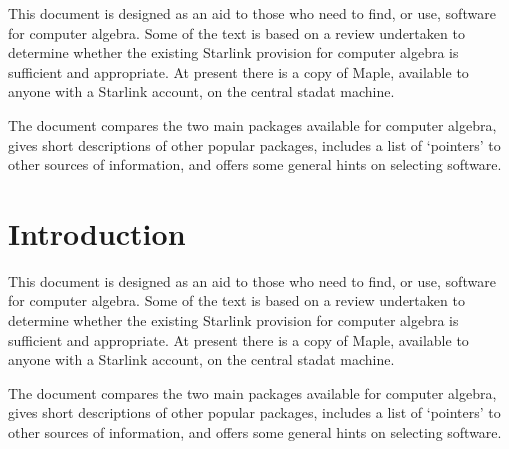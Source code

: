 This document is designed as an aid to those who need to find, or use,
software for computer algebra.
Some of the text is based on a review undertaken to determine whether
the existing Starlink provision for computer algebra is sufficient and
appropriate.
At present there is a copy of Maple, available to anyone with a Starlink
account, on the central stadat machine.

The document compares the two main packages available for computer algebra,
gives short descriptions of other popular packages, includes a list of
`pointers' to other sources of information, and offers some general hints
on selecting software.
 \newpage
 \begin{latexonly}
   \setlength{\parskip}{0mm}
   \setcounter{tocdepth}{2}
   \latexonlytoc
   \setlength{\parskip}{\medskipamount}
 \end{latexonly}
\cleardoublepage
\renewcommand{\thepage}{\arabic{page}}
\setcounter{page}{1}

\section{\label{se_introduction}Introduction}

This document is designed as an aid to those who need to find, or use,
software for computer algebra.
Some of the text is based on a review undertaken to determine whether
the existing Starlink provision for computer algebra is sufficient and
appropriate.
At present there is a copy of Maple, available to anyone with a Starlink
account, on the central stadat machine.

The document compares the two main packages available for computer algebra,
gives short descriptions of other popular packages, includes a list of
`pointers' to other sources of information, and offers some general hints
on selecting software.



